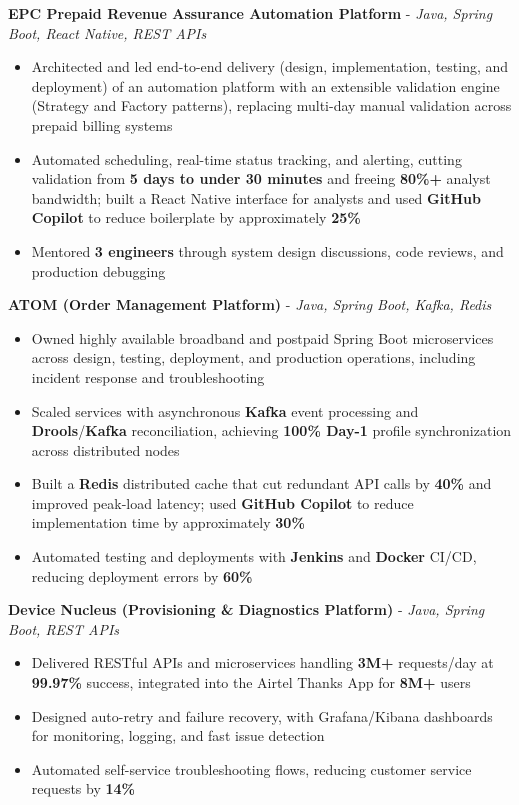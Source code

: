 \documentclass[letterpaper,10pt]{article}
\newcommand{\resumeItem}[1]{
  \item\small{{#1 \vspace{-2pt}}}
}
\newcommand{\resumeItemListStart}{\begin{itemize}[itemsep=0pt,topsep=2pt,parsep=0pt]}
\newcommand{\resumeItemListEnd}{\end{itemize}\vspace{-5pt}}
\begin{document}
      \vspace{4pt}
      \textbf{\small EPC Prepaid Revenue Assurance Automation Platform} - \textit{\small Java, Spring Boot, React Native, REST APIs} \\
      \vspace{-2pt}
      \resumeItemListStart
        \resumeItem{Architected and led end-to-end delivery (design, implementation, testing, and deployment) of an automation platform with an extensible validation engine (Strategy and Factory patterns), replacing multi-day manual validation across prepaid billing systems}
        \resumeItem{Automated scheduling, real-time status tracking, and alerting, cutting validation from \textbf{5 days to under 30 minutes} and freeing \textbf{80\%+} analyst bandwidth; built a React Native interface for analysts and used \textbf{GitHub Copilot} to reduce boilerplate by approximately \textbf{25\%}}
        \resumeItem{Mentored \textbf{3 engineers} through system design discussions, code reviews, and production debugging}
      \resumeItemListEnd

      \vspace{2pt}
      \textbf{\small ATOM (Order Management Platform)} - \textit{\small Java, Spring Boot, Kafka, Redis} \\
      \vspace{-2pt}
      \resumeItemListStart
        \resumeItem{Owned highly available broadband and postpaid Spring Boot microservices across design, testing, deployment, and production operations, including incident response and troubleshooting}
        \resumeItem{Scaled services with asynchronous \textbf{Kafka} event processing and \textbf{Drools}/\textbf{Kafka} reconciliation, achieving \textbf{100\% Day-1} profile synchronization across distributed nodes}
        \resumeItem{Built a \textbf{Redis} distributed cache that cut redundant API calls by \textbf{40\%} and improved peak-load latency; used \textbf{GitHub Copilot} to reduce implementation time by approximately \textbf{30\%}}
        \resumeItem{Automated testing and deployments with \textbf{Jenkins} and \textbf{Docker} CI/CD, reducing deployment errors by \textbf{60\%}}
      \resumeItemListEnd

      \vspace{2pt}
      \textbf{\small Device Nucleus (Provisioning \& Diagnostics Platform)} - \textit{\small Java, Spring Boot, REST APIs} \\
      \vspace{-2pt}
      \resumeItemListStart
        \resumeItem{Delivered RESTful APIs and microservices handling \textbf{3M+} requests/day at \textbf{99.97\%} success, integrated into the Airtel Thanks App for \textbf{8M+} users}
        \resumeItem{Designed auto-retry and failure recovery, with Grafana/Kibana dashboards for monitoring, logging, and fast issue detection}
        \resumeItem{Automated self-service troubleshooting flows, reducing customer service requests by \textbf{14\%}}
      \resumeItemListEnd
\end{document}
